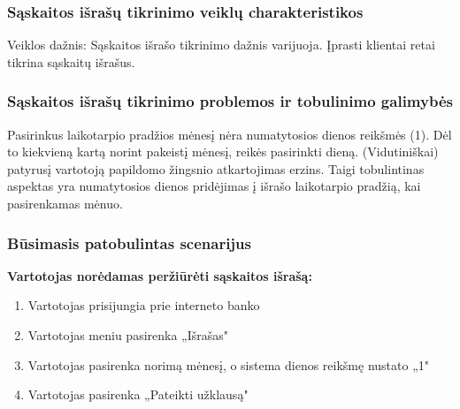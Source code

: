 \documentclass{VUMIFPSkursinis}
\begin{document}
\subsubsection{Sąskaitos išrašų tikrinimo veiklų charakteristikos}
Veiklos dažnis: Sąskaitos išrašo tikrinimo dažnis varijuoja. Įprasti klientai retai tikrina sąskaitų išrašus. 
\subsubsection{Sąskaitos išrašų tikrinimo problemos ir tobulinimo galimybės}
Pasirinkus laikotarpio pradžios mėnesį nėra numatytosios dienos reikšmės (1). Dėl to kiekvieną kartą norint pakeistį mėnesį, reikės pasirinkti dieną. (Vidutiniškai) patyrusį vartotoją papildomo žingsnio atkartojimas erzins. Taigi tobulintinas aspektas yra numatytosios dienos pridėjimas į išrašo laikotarpio pradžią, kai pasirenkamas mėnuo.
\subsubsection{Būsimasis patobulintas scenarijus}
\begin{center}
	\textbf{Vartotojas norėdamas peržiūrėti sąskaitos išrašą:}
\end{center}
\begin{enumerate}
	\item Vartotojas prisijungia prie interneto banko
	\item Vartotojas meniu pasirenka „Išrašas"
	\item Vartotojas pasirenka norimą mėnesį, o sistema dienos reikšmę nustato „1"
	\item Vartotojas pasirenka „Pateikti užklausą"
\end{enumerate}
\end{document}
